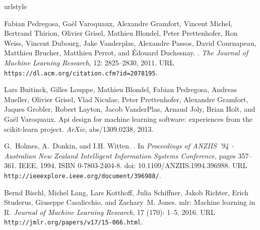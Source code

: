 \documentclass{article}
\begin{document}


\providecommand{\natexlab}[1]{#1}
\providecommand{\url}[1]{\texttt{#1}}
\expandafter\ifx\csname urlstyle\endcsname\relax
  \providecommand{\doi}[1]{doi: #1}\else
  \providecommand{\doi}{doi: \begingroup \urlstyle{rm}\Url}\fi

\begin{thebibliography}{18}
Fabian Pedregosa, Ga{\"{e}}l Varoquaux, Alexandre Gramfort, Vincent Michel,
  Bertrand Thirion, Olivier Grisel, Mathieu Blondel, Peter Prettenhofer, Ron
  Weiss, Vincent Dubourg, Jake Vanderplas, Alexandre Passos, David Cournapeau,
  Matthieu Brucher, Matthieu Perrot, and {\'{E}}douard Duchesnay.
.
\newblock \emph{The Journal of Machine Learning Research}, 12:
  2825--2830, 2011.
\newblock URL \url{https://dl.acm.org/citation.cfm?id=2078195}.

Lars Buitinck, Gilles Louppe, Mathieu Blondel, Fabian Pedregosa, Andreas
  Mueller, Olivier Grisel, Vlad Niculae, Peter Prettenhofer, Alexandre
  Gramfort, Jaques Grobler, Robert Layton, Jacob VanderPlas, Arnaud Joly, Brian
  Holt, and Ga{\"e}l Varoquaux.
\newblock Api design for machine learning software: experiences from the
  scikit-learn project.
\newblock \emph{ArXiv}, abs/1309.0238, 2013.

G.~Holmes, A.~Donkin, and I.H. Witten.
.
\newblock In \emph{Proceedings of ANZIIS '94 - Australian New Zealand
  Intelligent Information Systems Conference}, pages 357--361. IEEE, 1994.
\newblock ISBN 0-7803-2404-8.
\newblock \doi{10.1109/ANZIIS.1994.396988}.
\newblock URL \url{http://ieeexplore.ieee.org/document/396988/}.

Bernd Bischl, Michel Lang, Lars Kotthoff, Julia Schiffner, Jakob Richter, Erich
  Studerus, Giuseppe Casalicchio, and Zachary~M. Jones.
\newblock mlr: Machine learning in {R}.
\newblock \emph{Journal of Machine Learning Research}, 17
  (170): 1--5, 2016.
\newblock URL \url{http://jmlr.org/papers/v17/15-066.html}.


\end{thebibliography}
\end{document}
